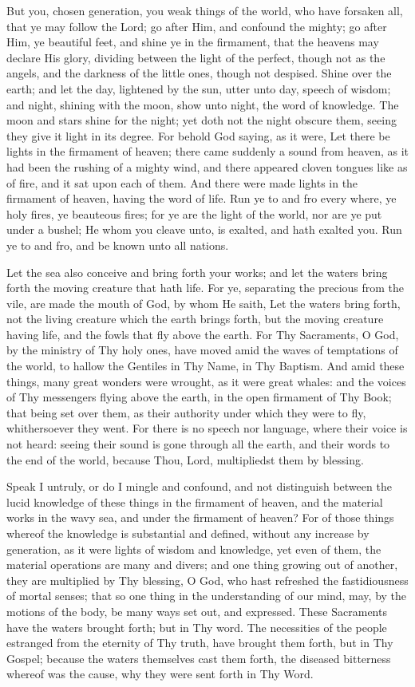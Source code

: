 \documentclass[b5paper,openright,12pt,twoside]{book}
\begin{document}
But you, chosen generation, you weak things of the world, who have
forsaken all, that ye may follow the Lord; go after Him, and confound
the mighty; go after Him, ye beautiful feet, and shine ye in the
firmament, that the heavens may declare His glory, dividing between the
light of the perfect, though not as the angels, and the darkness of the
little ones, though not despised. Shine over the earth; and let the
day, lightened by the sun, utter unto day, speech of wisdom; and night,
shining with the moon, show unto night, the word of knowledge. The moon
and stars shine for the night; yet doth not the night obscure them,
seeing they give it light in its degree. For behold God saying, as
it were, Let there be lights in the firmament of heaven; there came
suddenly a sound from heaven, as it had been the rushing of a mighty
wind, and there appeared cloven tongues like as of fire, and it sat upon
each of them. And there were made lights in the firmament of heaven,
having the word of life. Run ye to and fro every where, ye holy fires,
ye beauteous fires; for ye are the light of the world, nor are ye put
under a bushel; He whom you cleave unto, is exalted, and hath exalted
you. Run ye to and fro, and be known unto all nations.

Let the sea also conceive and bring forth your works; and let the waters
bring forth the moving creature that hath life. For ye, separating the
precious from the vile, are made the mouth of God, by whom He saith, Let
the waters bring forth, not the living creature which the earth brings
forth, but the moving creature having life, and the fowls that fly above
the earth. For Thy Sacraments, O God, by the ministry of Thy holy ones,
have moved amid the waves of temptations of the world, to hallow the
Gentiles in Thy Name, in Thy Baptism. And amid these things, many great
wonders were wrought, as it were great whales: and the voices of Thy
messengers flying above the earth, in the open firmament of Thy Book;
that being set over them, as their authority under which they were to
fly, whithersoever they went. For there is no speech nor language, where
their voice is not heard: seeing their sound is gone through all the
earth, and their words to the end of the world, because Thou, Lord,
multipliedst them by blessing.

Speak I untruly, or do I mingle and confound, and not distinguish
between the lucid knowledge of these things in the firmament of heaven,
and the material works in the wavy sea, and under the firmament of
heaven? For of those things whereof the knowledge is substantial and
defined, without any increase by generation, as it were lights of wisdom
and knowledge, yet even of them, the material operations are many and
divers; and one thing growing out of another, they are multiplied by Thy
blessing, O God, who hast refreshed the fastidiousness of mortal senses;
that so one thing in the understanding of our mind, may, by the motions
of the body, be many ways set out, and expressed. These Sacraments have
the waters brought forth; but in Thy word. The necessities of the people
estranged from the eternity of Thy truth, have brought them forth,
but in Thy Gospel; because the waters themselves cast them forth, the
diseased bitterness whereof was the cause, why they were sent forth in
Thy Word.
\end{document}
